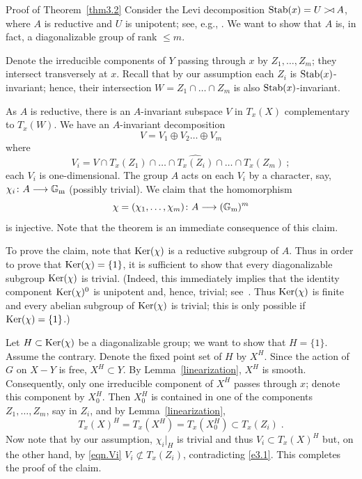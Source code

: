 \begin{pf*}{Proof of Theorem~\ref{thm3.2}}
Consider the Levi decomposition $\operatorname{Stab}(x) = U \mathbin{{>}\!{\triangleleft}} A$, where
$A$ is reductive and $U$ is unipotent; see, e.g., \cite[Section 6.4]{ov}.
We want to show that $A$ is, in fact, a diagonalizable group of rank $\leq m$. 

Denote the irreducible components of $Y$ passing through $x$ by
$Z_1, \dots, Z_m$; they intersect transversely at $x$.
Recall that by our assumption each $Z_i$ is $\operatorname{Stab}(x)$-invariant; hence,
their intersection $W=Z_1\cap\dots\cap Z_m$ is also $\operatorname{Stab}(x)$-invariant.

As $A$ is reductive, there is an $A$-invariant subspace $V$ in $T_x(X)$
complementary to $T_x(W)$.
We have an $A$-invariant decomposition
\[
V=V_1 \oplus V_2 \dots \oplus V_m
\]
where
\begin{equation}  \label{eqn.Vi}
V_i=V\cap T_x(Z_1)\cap\dots\cap\widehat{T_x(Z_i)}\cap\dots\cap T_x(Z_m)\ ;
\end{equation}
each $V_i$ is one-dimensional.
The group $A$ acts on each $V_i$ by a character, say,
$\chi_i\colon A\longrightarrow {\Bbb G}_{\operatorname{m}}$ (possibly trivial). 
We claim that the homomorphism
\[
\chi = (\chi_1, \dots, \chi_m)\colon A \longrightarrow ({\Bbb G}_{\operatorname{m}})^m
\]
is injective. Note that the theorem is an immediate consequence of this claim.

To prove the claim, note that $\operatorname{Ker}(\chi)$ is a reductive
subgroup of $A$. Thus in order to prove that $\operatorname{Ker}(\chi) = \{ 1\}$,
it is sufficient to show that every diagonalizable subgroup $\operatorname{Ker}(\chi)$ 
is trivial.  (Indeed, this immediately implies that the identity component 
$\operatorname{Ker}(\chi)^0$ is unipotent and, hence, trivial; 
see~\cite[Exercise 1, p. 137]{humphreys}. Thus $\operatorname{Ker}(\chi)$ is finite 
and every abelian subgroup of $\operatorname{Ker}(\chi)$ is trivial; this is only 
possible if $\operatorname{Ker}(\chi) = \{ 1 \}$.)  

Let $H \subset \operatorname{Ker}(\chi)$ be a diagonalizable group; we want 
to show that $H = \{ 1 \}$. Assume the contrary.
Denote the fixed point set of $H$ by $X^H$. Since the action of $G$ on
$X-Y$ is free, $X^H \subset Y$.
By Lemma~\ref{linearization}, 
$X^H$ is smooth. Consequently, only one irreducible component of $X^H$ 
passes through $x$; denote this component by $X^H_0$. Then $X^H_0$ is 
contained in one of the components $Z_1, \dots, Z_m$, say in $Z_i$, and
by Lemma~\ref{linearization}, 
\begin{equation} \label{e3.1}
T_x(X)^H = T_x(X^H) = T_x(X^H_0) \subset T_x(Z_i)  \; .
\end{equation}
Now note that by our assumption, $\chi_i|_H$ is trivial and thus
$V_i \subset T_x(X)^H$ but, on the other hand, by \eqref{eqn.Vi}
$V_i \not \subset T_x(Z_i)$, 
contradicting \eqref{e3.1}. This completes the proof of the claim.
\end{pf*}

